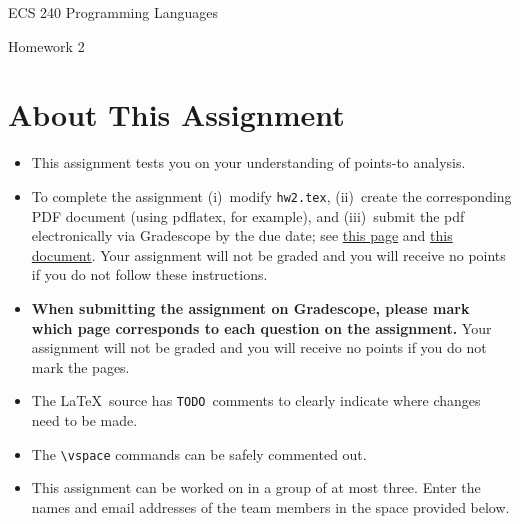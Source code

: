 \documentclass[12pt]{article}
\begin{document}
    
    \begin{center}
        \bigskip
        {\LARGE ECS 240 Programming Languages} \medskip
                
        {\Large Homework 2} \bigskip
    
    \end{center}

    \section*{About This Assignment}
    
    \begin{itemize}
      \item This assignment tests you on your understanding of points-to analysis.
      \item To complete the assignment (i)~modify \texttt{hw2.tex}, (ii)~create
      the corresponding PDF document (using pdflatex, for example), and
      (iii)~submit the pdf electronically via Gradescope by the due date; see
      \href{https://www.gradescope.com/get_started#student-submission}{this page}
      and
      \href{http://gradescope-static-assets.s3-us-west-2.amazonaws.com/help/submitting_hw_guide.pdf}{this
      document}. Your assignment will not be graded and you will receive no
      points if you do not follow these instructions. 

      \item \textbf{When submitting the assignment on Gradescope, please mark
      which page corresponds to each question on the assignment.}  Your
      assignment will not be graded and you will receive no points if you do not
      mark the pages.      

      \item The  \LaTeX\ source has \texttt{TODO}~comments to clearly indicate
      where changes need to be made. 
      \item The \verb=\vspace= commands can be safely commented out.
      \item This assignment can be worked on in a group of at most three. Enter
      the names and email addresses of the team members in the space provided
      below.
    \end{itemize}
\end{document}
